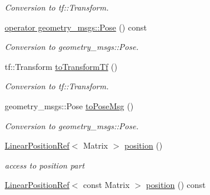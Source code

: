 \begin{DoxyCompactItemize}
\begin{DoxyCompactList}\small\item\em Conversion to tf\+::\+Transform. \end{DoxyCompactList}\item 
\hyperlink{classow__core_1_1HomogeneousTransformation_ad92f1c9512c6fcc000ac73abdba5a103}{operator geometry\+\_\+msgs\+::\+Pose} () const \hypertarget{classow__core_1_1HomogeneousTransformation_ad92f1c9512c6fcc000ac73abdba5a103}{}\label{classow__core_1_1HomogeneousTransformation_ad92f1c9512c6fcc000ac73abdba5a103}

\begin{DoxyCompactList}\small\item\em Conversion to geometry\+\_\+msgs\+::\+Pose. \end{DoxyCompactList}\item 
tf\+::\+Transform \hyperlink{classow__core_1_1HomogeneousTransformation_aeaf8eff278df891b098ea4bf1ce81cc9}{to\+Transform\+Tf} ()\hypertarget{classow__core_1_1HomogeneousTransformation_aeaf8eff278df891b098ea4bf1ce81cc9}{}\label{classow__core_1_1HomogeneousTransformation_aeaf8eff278df891b098ea4bf1ce81cc9}

\begin{DoxyCompactList}\small\item\em Conversion to tf\+::\+Transform. \end{DoxyCompactList}\item 
geometry\+\_\+msgs\+::\+Pose \hyperlink{classow__core_1_1HomogeneousTransformation_a32bd1fa2962cc71f8331fcfc39d55b2e}{to\+Pose\+Msg} ()\hypertarget{classow__core_1_1HomogeneousTransformation_a32bd1fa2962cc71f8331fcfc39d55b2e}{}\label{classow__core_1_1HomogeneousTransformation_a32bd1fa2962cc71f8331fcfc39d55b2e}

\begin{DoxyCompactList}\small\item\em Conversion to geometry\+\_\+msgs\+::\+Pose. \end{DoxyCompactList}\item 
\hyperlink{classow__core_1_1LinearPositionRef}{Linear\+Position\+Ref}$<$ Matrix $>$ \hyperlink{classow__core_1_1HomogeneousTransformation_a45c97f141777f691dbed43420d7d43e3}{position} ()\hypertarget{classow__core_1_1HomogeneousTransformation_a45c97f141777f691dbed43420d7d43e3}{}\label{classow__core_1_1HomogeneousTransformation_a45c97f141777f691dbed43420d7d43e3}

\begin{DoxyCompactList}\small\item\em access to position part \end{DoxyCompactList}\item 
\hyperlink{classow__core_1_1LinearPositionRef}{Linear\+Position\+Ref}$<$ const Matrix $>$ \hyperlink{classow__core_1_1HomogeneousTransformation_ae2eecf2fd172b4da05031f94d3d050a7}{position} () const \hypertarget{classow__core_1_1HomogeneousTransformation_ae2eecf2fd172b4da05031f94d3d050a7}{}\label{classow__core_1_1HomogeneousTransformation_ae2eecf2fd172b4da05031f94d3d050a7}


\end{DoxyCompactItemize}
